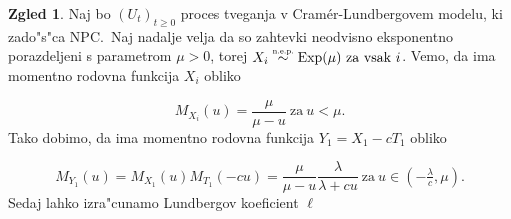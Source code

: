 \documentclass[12pt, a4paper, reqno]{amsart}
\theoremstyle{definition}
\newtheorem{zgled}[definicija]{Zgled}
\theoremstyle{plain}
\newcommand{\1}{\mathds{1}}
\begin{document}
            \begin{zgled}
                Naj bo $(U_t)_{t\geq0}$ proces tveganja v Cramér-Lundbergovem modelu, ki zado"s"ca NPC.\ Naj 
                nadalje velja da so zahtevki neodvisno eksponentno porazdeljeni s parametrom $\mu > 0$, torej 
                $X_i \stackrel{\text{\scalebox{0.8}{n.e.p.}}}{\sim} \text{Exp}(\mu) \ \text{za vsak} \ i$. Vemo, da ima momentno rodovna funkcija 
                $X_i$ obliko 

                \begin{equation*}
                    M_{X_i}(u) = \frac{\mu}{\mu - u} \ \text{za} \ u<\mu.
                \end{equation*}
                Tako dobimo, da ima momentno rodovna funkcija $Y_1 = X_1 - cT_1$ obliko 

                \begin{equation*}
                    M_{Y_1}(u) = M_{X_1}(u)M_{T_1}(-cu) = 
                    \frac{\mu}{\mu - u}\frac{\lambda}{\lambda + cu} \ \text{za} \ u\in (-\tfrac{\lambda}{c}, \mu).
                \end{equation*}
                Sedaj lahko izra"cunamo Lundbergov koeficient $\ell$


\end{zgled}
\end{document}
